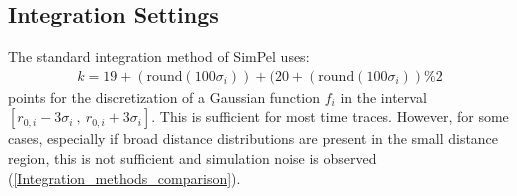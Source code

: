 \documentclass[pdftex,bezier,german,a4,twoside, headexclude,12pt,nochapterprefix, titlepage]{extarticle}
\newcommand{\simpel}{\textsf{SimPel}}
\begin{document}
\clearpage

\subsection{Integration Settings}

The standard integration method of \simpel{} uses:
%
\begin{align*}
k =  19+(\mathrm{round}(100\sigma_i)) + (20+(\mathrm{round}(100\sigma_i))\%2
\end{align*}
%
points for the discretization of a Gaussian function $f_i$ in the interval $[r_{0,i}-3\sigma_i \ ,\ r_{0,i}+3\sigma_i]$. This is sufficient for most time traces. However, for some cases, especially if broad distance distributions are present in the small distance region, this is not sufficient and simulation noise is observed (\autoref{Integration_methods_comparison}).
\end{document}
